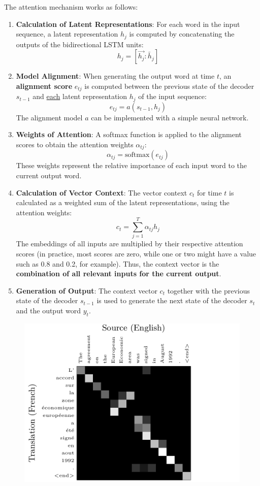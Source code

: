 The attention mechanism works as follows:
\begin{enumerate}
    \item \textbf{Calculation of Latent Representations}:
    For each word in the input sequence, a latent representation $h_j$ is computed by concatenating the outputs of the bidirectional LSTM units:
    $$
    h_j=\left[ \overrightarrow{h_j}:\overleftarrow{h_j} \right]
    $$
    
    \item \textbf{Model Alignment}:
    When generating the output word at time $t$, an \textbf{alignment score} $e_{tj}$ is computed between the previous state of the decoder $s_{t-1}$ and \underline{each} latent representation $h_j$ of the input sequence:
    $$
       e_{tj} = a(s_{t-1}, h_j)
    $$
    The alignment model $a$ can be implemented with a simple neural network.
    \vspace{0.25cm}
    
    \item \textbf{Weights of Attention}:
    A softmax function is applied to the alignment scores to obtain the attention weights $\alpha_{tj}$:
    $$
       \alpha_{tj} = \text{softmax}(e_{tj})
    $$
    These weights represent the relative importance of each input word to the current output word.
    \vspace{0.25cm}
    
    \item \textbf{Calculation of Vector Context}:
    The vector context $c_t$ for time $t$ is calculated as a weighted sum of the latent representations, using the attention weights:
    $$
       c_t = \sum_{j=1}^{T}\alpha_{tj}h_j
    $$
    The embeddings of all inputs are multiplied by their respective attention scores (in practice, most scores are zero, while one or two might have a value such as 0.8 and 0.2, for example). Thus, the context vector is the \textbf{combination of all relevant inputs for the current output}.
    \vspace{0.25cm}
    
    \item \textbf{Generation of Output}:
    The context vector $c_t$ together with the previous state of the decoder $s_{t-1}$ is used to generate the next state of the decoder $s_t$ and the output word $y_t$.
\end{enumerate}


\begin{figure}[!htbp]
    \centering
    \includegraphics[width=0.5\linewidth]{tikz/chapter7 - Attention is Alignment 1.pdf}
\end{figure}

